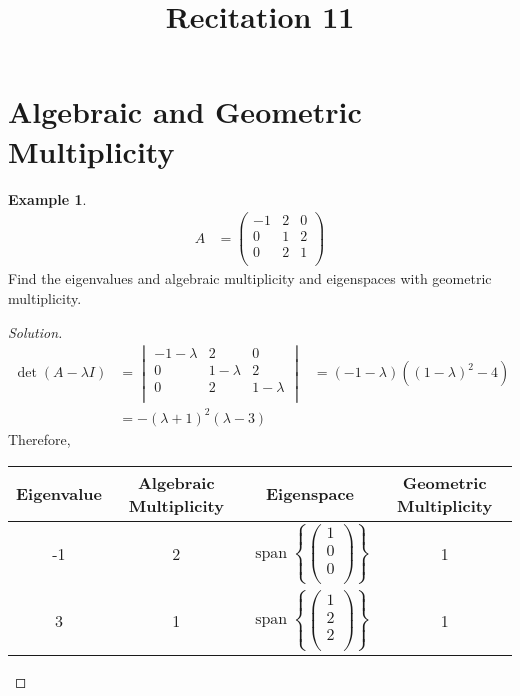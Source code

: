 \documentclass[fleqn, a4paper, 12pt]{article}
\title{Recitation 11}
\author{}
\date{\formatdate{4}{1}{2015}}
\theoremstyle{definition}
\newtheorem{example}{Example}
\theoremstyle{theorem}
\newenvironment{solution}
{\begin{proof}[Solution]\let\qed\relax}
	{\end{proof}}
\DeclareMathOperator{\vspan}{\mathrm{span}} %
\begin{document}
\maketitle

\tableofcontents

\newpage
\section{Algebraic and Geometric Multiplicity}

\begin{example}
	\begin{align*}
		A &=
			\begin{pmatrix}
				-1 & 2 & 0\\
				0 & 1 & 2\\
				0 & 2 & 1\\
			\end{pmatrix}
	\end{align*}
	Find the eigenvalues and algebraic multiplicity and eigenspaces with geometric multiplicity.
\end{example}

\begin{solution}
	\begin{align*}
		\det(A - \lambda I) &= 
			\begin{vmatrix}
				-1 - \lambda & 2 & 0\\
				0 & 1 - \lambda & 2\\
				0 & 2 & 1 - \lambda\\
			\end{vmatrix}
		&= (-1 - \lambda)((1 - \lambda)^2 - 4)\\
		&= - (\lambda + 1)^2 (\lambda - 3)
	\end{align*}
	Therefore,\\
	\begin{tabular}{|c|c|c|c|}
		\hline
		Eigenvalue & Algebraic Multiplicity & Eigenspace & Geometric Multiplicity\\
		\hline
		-1 & 2 & $\vspan
			\left\lbrace
				\begin{pmatrix}
					1\\
					0\\
					0\\
				\end{pmatrix}
			\right\rbrace
			$
		& 1\\
		\hline
		3 & 1 & $\vspan
			\left\lbrace
				\begin{pmatrix}
				1\\
				2\\
				2\\
				\end{pmatrix}
			\right\rbrace
			$
		& 1\\ 
		\hline
	\end{tabular}
\end{solution}
\end{document}
